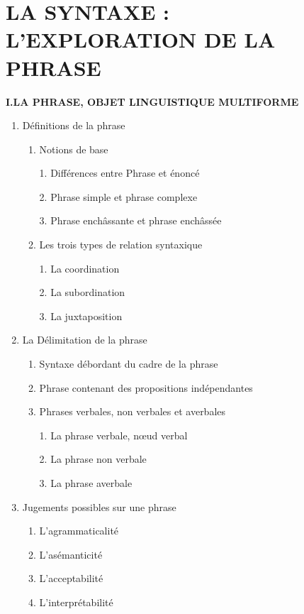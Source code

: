 \chapter{LA SYNTAXE : L’EXPLORATION DE LA PHRASE}
\label{chapter-10}
\begin{keybox}
\small{}
\renewcommand{\thempfootnote}{校\arabic{editorialnote}}
\textbf{I.\quad LA PHRASE, OBJET LINGUISTIQUE MULTIFORME}
\begin{enumerate}[label=\arabic*.]
\item Définitions de la phrase
\begin{enumerate}[label=\textcircled{\scriptsize\arabic*}]
\item Notions de base\par
1. Différences entre Phrase et énoncé\par
2. Phrase simple et phrase complexe\par
3. Phrase enchâssante et phrase enchâssée
\item Les trois types de relation syntaxique\par
1. La coordination\par 2. La subordination\par 3. La juxtaposition
\end{enumerate}
\item La Délimitation de la phrase
\begin{enumerate}[label=\textcircled{\scriptsize\arabic*}]
\item Syntaxe débordant du cadre de la phrase
\item Phrase contenant des propositions indépendantes
\item Phrases verbales, non verbales et averbales\par
1. La phrase verbale, nœud verbal\par
2. La phrase non verbale\par
3. La phrase averbale
\end{enumerate}
\item Jugements possibles sur une phrase
\begin{enumerate}[label=\textcircled{\scriptsize\arabic*}]
\item L’agrammaticalité
\item L’asémanticité
\item L’acceptabilité
\item L’interprétabilité
\end{enumerate}

\end{enumerate}
\end{keybox}
